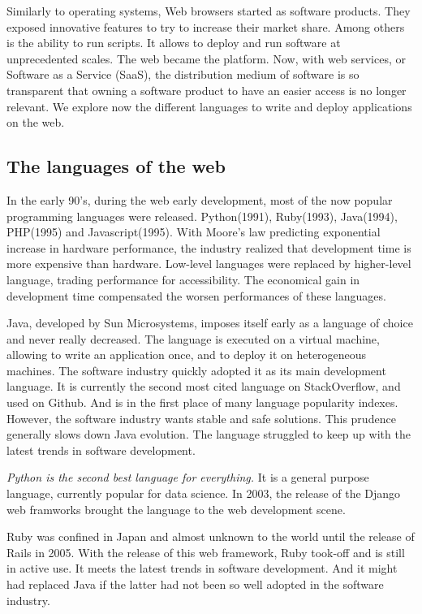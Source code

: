 Similarly to operating systems, Web browsers started as software products.
They exposed innovative features to try to increase their market share.
Among others is the ability to run scripts.
It allows to deploy and run software at unprecedented scales.
The web became the platform.
Now, with web services, or Software as a Service (SaaS), the distribution medium of software is so transparent that owning a software product to have an easier access is no longer relevant.
We explore now the different languages to write and deploy applications on the web.

\subsection{The languages of the web}

In the early 90's, during the web early development, most of the now popular programming languages were released.
Python(1991), Ruby(1993), Java(1994), PHP(1995) and  Javascript(1995).
With Moore's law predicting exponential increase in hardware performance, the industry realized that development time is more expensive than hardware.
Low-level languages were replaced by higher-level language, trading performance for accessibility.
The economical gain in development time compensated the worsen performances of these languages.

Java, developed by Sun Microsystems, imposes itself early as a language of choice and never really decreased.
The language is executed on a virtual machine, allowing to write an application once, and to deploy it on heterogeneous machines.
The software industry quickly adopted it as its main development language.
It is currently the second most cited language on StackOverflow, and used on Github.
And is in the first place of many language popularity indexes.
However, the software industry wants stable and safe solutions.
This prudence generally slows down Java evolution.
The language struggled to keep up with the latest trends in software development.

\textit{Python is the second best language for everything.}
It is a general purpose language, currently popular for data science.
In 2003, the release of the Django web framworks brought the language to the web development scene.

Ruby was confined in Japan and almost unknown to the world until the release of Rails in 2005.
With the release of this web framework, Ruby took-off and is still in active use.
It meets the latest trends in software development.
And it might had replaced Java if the latter had not been so well adopted in the software industry.

